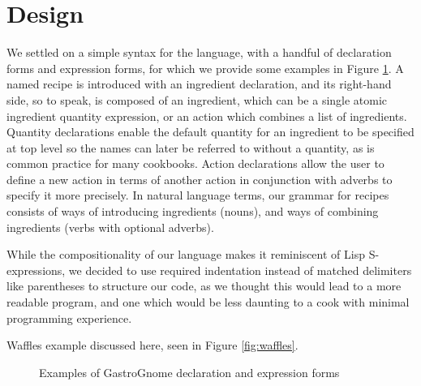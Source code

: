 \documentclass[pldi]{sigplanconf-pldi15}
\begin{document}
\section{Design}
We settled on a simple syntax for the language, with a handful of declaration
forms and expression forms, for which we provide some examples in Figure
\ref{fig:expdec}. A named recipe is introduced with an ingredient declaration,
and its right-hand side, so to speak, is composed of an ingredient, which can
be a single atomic ingredient quantity expression, or an action which combines
a list of ingredients. Quantity declarations enable the default quantity for
an ingredient to be specified at top level so the names can later be referred
to without a quantity, as is common practice for many cookbooks. Action
declarations allow the user to define a new action in terms of another action
in conjunction with adverbs to specify it more precisely. In natural language
terms, our grammar for recipes consists of ways of introducing ingredients
(nouns), and ways of combining ingredients (verbs with optional adverbs).

While the compositionality of our language makes it reminiscent of Lisp
S-expressions, we decided to use required indentation instead of matched
delimiters like parentheses to structure our code, as we thought this would
lead to a more readable program, and one which would be less daunting to a
cook with minimal programming experience.

Waffles example discussed here, seen in Figure \ref{fig:waffles}.

\begin{figure}
	
	\caption{Examples of GastroGnome declaration and expression forms}
	\label{fig:expdec}
\end{figure}

\end{document}
